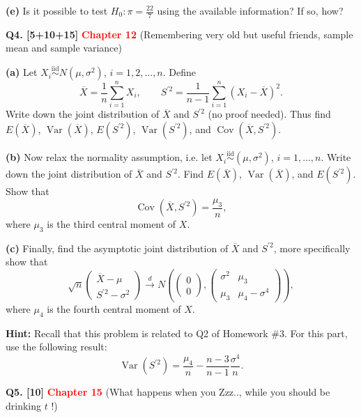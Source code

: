\documentclass[11pt]{article}
\begin{document}
\textbf{(e)} Is it possible to test $H_0:\pi=\frac{22}{7}$ using the available information? If so, how?

\bigskip

\textbf{Q4. [5+10+15]} \textbf{\textcolor{red}{Chapter 12}} (Remembering very old but useful friends, sample mean and sample variance)

\textbf{(a)} Let $X_i\overset{\mathrm{iid}}{\sim}N(\mu,\sigma^2)$, $i=1,2,\ldots,n$. Define
\[
\overline{X}=\frac{1}{n}\sum_{i=1}^n X_i,
\qquad
S^{\prime 2}=\frac{1}{n-1}\sum_{i=1}^n(X_i-\overline{X})^2.
\]
Write down the joint distribution of $\overline{X}$ and $S^{\prime 2}$ (no proof needed). Thus find $E(\overline{X})$, $\operatorname{Var}(\overline{X})$, $E(S^{\prime 2})$, $\operatorname{Var}(S^{\prime 2})$, and $\operatorname{Cov}(\overline{X},S^{\prime 2})$.

\textbf{(b)} Now relax the normality assumption, i.e. let $X_i\overset{\mathrm{iid}}{\sim}(\mu,\sigma^2)$, $i=1,\ldots,n$. Write down the joint distribution of $\overline{X}$ and $S^{\prime 2}$. Find $E(\overline{X})$, $\operatorname{Var}(\overline{X})$, and $E(S^{\prime 2})$. Show that
\[
\operatorname{Cov}(\overline{X},S^{\prime 2})=\frac{\mu_3}{n},
\]
where $\mu_3$ is the third central moment of $X$.

\textbf{(c)} Finally, find the asymptotic joint distribution of $\overline{X}$ and $S^{\prime 2}$, more specifically show that
\[
\sqrt{n}
\begin{pmatrix}
\overline{X}-\mu\\
S^{\prime 2}-\sigma^2
\end{pmatrix}
\overset{d}{\longrightarrow}
N\left(
\begin{pmatrix}0\\0\end{pmatrix},
\begin{pmatrix}
\sigma^2 & \mu_3\\
\mu_3 & \mu_4-\sigma^4
\end{pmatrix}
\right),
\]
where $\mu_4$ is the fourth central moment of $X$.

\textbf{Hint:} Recall that this problem is related to Q2 of Homework \#3. For this part, use the following result:
\[
\operatorname{Var}(S^{\prime 2})=
\frac{\mu_4}{n}-\frac{n-3}{n-1}\frac{\sigma^4}{n}.
\]

\bigskip

\textbf{Q5. [10]} \textbf{\textcolor{red}{Chapter 15}} (What happens when you Zzz.., while you should be drinking $t$ !)
\end{document}
